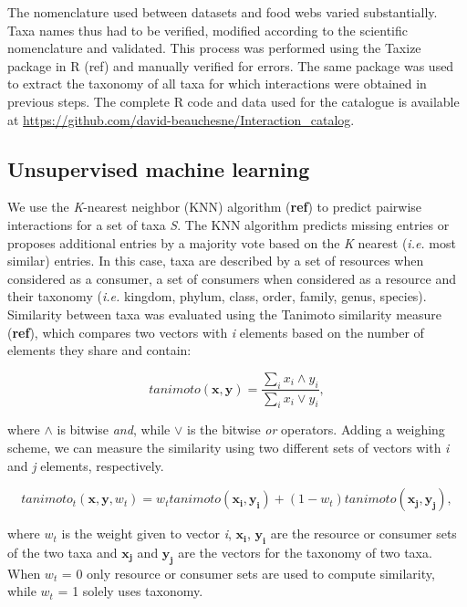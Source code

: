 \documentclass[letterpaper]{article}
\begin{document}
The nomenclature used between datasets and food webs varied substantially. Taxa names thus had to be verified, modified according to the scientific nomenclature and validated. This process was performed using the Taxize package in R (ref) and manually verified for errors. The same package was used to extract the taxonomy of all taxa for which interactions were obtained in previous steps. The complete R code and data used for the catalogue is available at \href{https://github.com/david-beauchesne/Interaction_catalog}{https://github.com/david-beauchesne/Interaction\_catalog}.

  \subsection{Unsupervised machine learning}
We use the \textit{K}-nearest neighbor (KNN) algorithm (\textbf{ref}) to predict pairwise interactions for a set of taxa \textit{S}. The KNN algorithm predicts missing entries or proposes additional entries by a majority vote based on the \textit{K} nearest (\textit{i.e.} most similar) entries. In this case, taxa are described by a set of resources when considered as a consumer, a set of consumers when considered as a resource and their taxonomy (\textit{i.e.} kingdom, phylum, class, order, family, genus, species). Similarity between taxa was evaluated using the Tanimoto similarity measure (\textbf{ref}), which compares two vectors with \textit{i} elements based on the number of elements they share and contain:

\begin{equation}
  tanimoto(\mathbf{x}, \mathbf{y}) = \frac{\sum_i x_i \land y_i}{\sum_i x_i \lor y_i},
\end{equation}

where $\land$ is bitwise \emph{and}, while $\lor$ is the bitwise \emph{or} operators. Adding a weighing scheme, we can measure the similarity using two different sets of vectors with \textit{i} and \textit{j} elements, respectively.

\begin{equation}
  tanimoto_t(\mathbf{x}, \mathbf{y}, w_t) = w_ttanimoto(\mathbf{x_i}, \mathbf{y_i}) + (1 - w_t)tanimoto(\mathbf{x_j}, \mathbf{y_j}),
\end{equation}

where $w_t$ is the weight given to vector \textit{i}, $\mathbf{x_i}$, $\mathbf{y_i}$ are the resource or consumer sets of the two taxa and $\mathbf{x_j}$ and $\mathbf{y_j}$ are the vectors for the taxonomy of two taxa. When $w_t$ = 0 only resource or consumer sets are used to compute similarity, while $w_t$ = 1 solely uses taxonomy.
\end{document}
